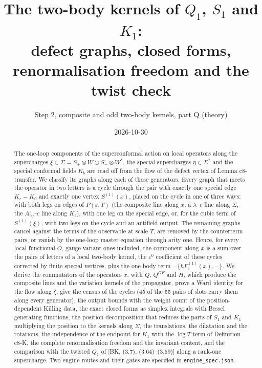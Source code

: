 \documentclass[11pt]{article}
\title{The two-body kernels of $Q_1$, $S_1$ and $K_1$:\\ defect graphs, closed forms, renormalisation freedom and the twist check}
\author{Step 2, composite and odd two-body kernels, part Q (theory)}
\date{2026-10-30}
\numberwithin{equation}{section}
\theoremstyle{plain}
\theoremstyle{definition}
\begin{document}
\maketitle

\begin{abstract}
The one-loop components of the superconformal action on local operators along the supercharges $\xi\in\Sigma=S_+\otimes W\oplus S_-\otimes W^*$, the special supercharges $\eta\in\Sigma^*$ and the special conformal fields $K_b$ are read off from the flow of the defect vertex of Lemma c8-transfer. We classify its graphs along each of these generators. Every graph that meets the operator in two letters is a cycle through the pair with exactly one special edge $K_\varepsilon-K_0$ and exactly one vertex $S^{(1)}(x)$, placed on the cycle in one of three ways: with both legs on edges of $P(\varepsilon,T)$ (the composite line along $x$: a $\lambda$--$c$ line along $\Sigma$, the $A|_V$--$c$ line along $K_b$), with one leg on the special edge, or, for the cubic term of $S^{(1)}(\xi)$, with two legs on the cycle and an antifield output. The remaining graphs cancel against the terms of the observable at scale $T$, are removed by the counterterm pairs, or vanish by the one-loop master equation through arity one. Hence, for every local functional $O$, gauge-variant ones included, the component along $x$ is a sum over the pairs of letters of a local two-body kernel, the $\varepsilon^0$ coefficient of these cycles corrected by finite special vertices, plus the one-body term $-\{\hbar F_1^{(1)}(x),-\}$. We derive the commutators of the operators $x.$ with $Q$, $Q^{GF}$ and $H$, which produce the composite lines and the variation kernels of the propagator, prove a Ward identity for the flow along $\xi$, give the census of the cycles (45 of the 55 pairs of slots carry them along every generator), the output bounds with the weight count of the position-dependent Killing data, the exact closed forms as simplex integrals with Bessel generating functions, the position decomposition that reduces the parts of $S_1$ and $K_1$ multiplying the position to the kernels along $\Sigma$, the translations, the dilatation and the rotations, the independence of the endpoint for $K_1$ with the $\log T$ term of Definition c8-K, the complete renormalisation freedom and the invariant content, and the comparison with the twisted $Q_1$ of [BK, (3.7), (3.64)--(3.69)] along a rank-one supercharge. Two engine routes and their gates are specified in \texttt{engine\_spec.json}.
\end{abstract}
\end{document}
